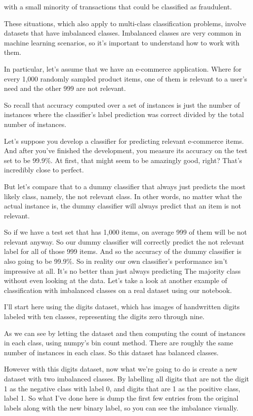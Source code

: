 \begin{multicols}{2}
with a small minority of transactions that could be classified as fraudulent. 

These situations, which also apply to multi-class classification problems, involve datasets that have imbalanced classes. Imbalanced classes are very common in machine learning scenarios, so it's important to understand how to work with them. 

In particular, let's assume that we have an e-commerce application. Where for every 1,000 randomly sampled product items, one of them is relevant to a user's need and the other 999 are not relevant. 

So recall that accuracy computed over a set of instances is just the number of instances where the classifier's label prediction was correct divided by the total number of instances. 

Let's suppose you develop a classifier for predicting relevant e-commerce items. And after you've finished the development, you measure its accuracy on the test set to be 99.9\%. At first, that might seem to be amazingly good, right? That's incredibly close to perfect. 

But let's compare that to a dummy classifier that always just predicts the most likely class, namely, the not relevant class. In other words, no matter what the actual instance is, the dummy classifier will always predict that an item is not relevant. 

So if we have a test set that has 1,000 items, on average 999 of them will be not relevant anyway. So our dummy classifier will correctly predict the not relevant label for all of those 999 items. And so the accuracy of the dummy classifier is also going to be 99.9\%. So in reality our own classifier's performance isn't impressive at all. It's no better than just always predicting The majority class without even looking at the data. Let's take a look at another example of classification with imbalanced classes on a real dataset using our notebook. 

I'll start here using the digits dataset, which has images of handwritten digits labeled with ten classes, representing the digits zero through nine. 

As we can see by letting the dataset and then computing the count of instances in each class, using numpy's bin count method. There are roughly the same number of instances in each class. So this dataset has balanced classes. 

However with this digits dataset, now what we're going to do is create a new dataset with two imbalanced classes. By labelling all digits that are not the digit 1 as the negative class with label 0, and digits that are 1 as the positive class, label 1. So what I've done here is dump the first few entries from the original labels along with the new binary label, so you can see the imbalance visually. 


\end{multicols}
